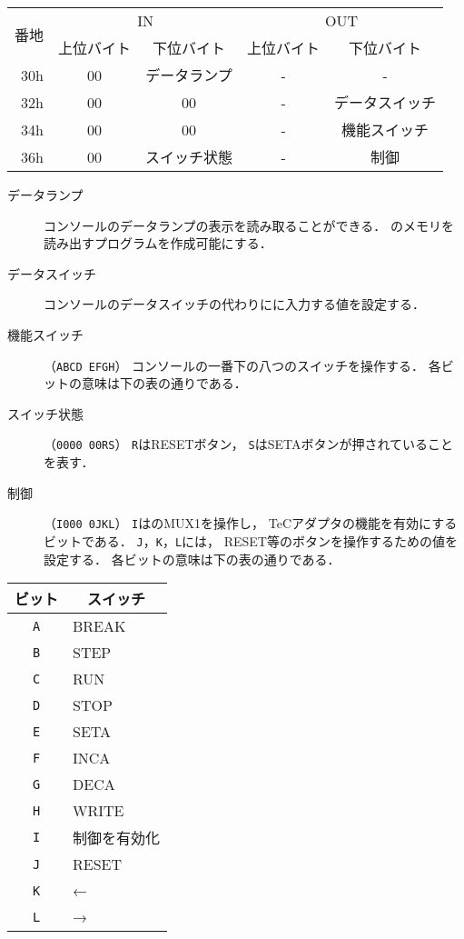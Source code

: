 \begin{center}
  \small\begin{tabular}{| r | c | c || c | c |}\hline
    \multirow{2}{*}{番地}
    & \multicolumn{2}{|c||}{IN}
    & \multicolumn{2}{c|}{OUT}
    \\\cline{2-5}
         & 上位バイト & 下位バイト & 上位バイト & 下位バイト
    \\\hline\hline
    30h  &  00 & データランプ
         &  -  & -              \\\hline
    32h  &  00 & 00
         &  -  & データスイッチ \\\hline
    34h  &  00 & 00
         &  -  & 機能スイッチ   \\\hline
    36h  &  00 & スイッチ状態
         &  -  & 制御           \\\hline
  \end{tabular}
\end{center}

\begin{description}
\item[データランプ]
  {\tec}コンソールのデータランプの表示を読み取ることができる．
  {\tec}のメモリを読み出す{\tac}プログラムを作成可能にする．
\item[データスイッチ]
  コンソールのデータスイッチの代わりに{\tec}に入力する値を設定する．
\item[機能スイッチ]（\texttt{ABCD EFGH}）
  {\tec}コンソールの一番下の八つのスイッチを操作する．
  各ビットの意味は下の表の通りである．
\item[スイッチ状態]（\texttt{0000 00RS}）
  \texttt{R}はRESETボタン，
  \texttt{S}はSETAボタンが押されていることを表す．
\item[制御]（\texttt{I000 0JKL}）
  \texttt{I}はのMUX1を操作し，
  TeCアダプタの機能を有効にするビットである．
  \texttt{J}，\texttt{K}，\texttt{L}には，
  RESET等のボタンを操作するための値を設定する．
  各ビットの意味は下の表の通りである．
\end{description}

\begin{center}
  \small\begin{tabular}{c | l}\hline\hline
  ビット     & \multicolumn{1}{|c}{スイッチ}\\\hline
  \texttt{A} & BREAK \\
  \texttt{B} & STEP  \\
  \texttt{C} & RUN   \\
  \texttt{D} & STOP  \\
  \texttt{E} & SETA  \\
  \texttt{F} & INCA  \\
  \texttt{G} & DECA  \\
  \texttt{H} & WRITE \\
  \texttt{I} & 制御を有効化 \\
  \texttt{J} & RESET \\
  \texttt{K} & ←  \\
  \texttt{L} & →  \\
  \end{tabular}
\end{center}

